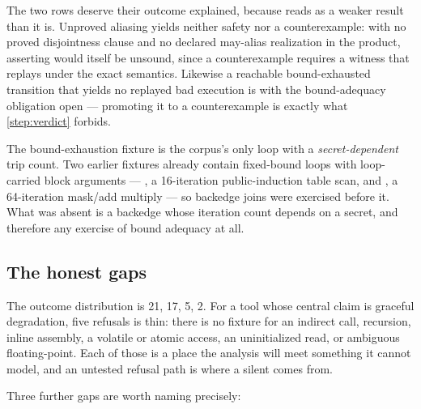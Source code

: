The two \Unknown{} rows deserve their outcome explained, because \Unknown{} reads
as a weaker result than it is. Unproved aliasing yields neither safety nor a
counterexample: with no proved disjointness clause and no declared may-alias
realization in the product, asserting \Unsafe{} would itself be unsound, since a
counterexample requires a witness that replays under the exact semantics.
Likewise a reachable bound-exhausted transition that yields no replayed bad
execution is \Unknown{} with the bound-adequacy obligation open --- promoting it
to a counterexample is exactly what \cref{step:verdict} forbids.

The bound-exhaustion fixture is the corpus's only loop with a
\emph{secret-dependent} trip count. Two earlier fixtures already contain
fixed-bound loops with loop-carried block arguments ---
, a 16-iteration public-induction table scan,
and , a 64-iteration mask/add multiply ---
so backedge joins were exercised before it. What was absent is a backedge whose
iteration count depends on a secret, and therefore any exercise of bound
adequacy at all.

\subsection{The honest gaps}

The outcome distribution is \Verified{} 21, \Unsafe{} 17, \Unknown{} 5,
\Conditional{} 2. For a tool whose central claim is graceful degradation, five
refusals is thin: there is no fixture for an indirect call, recursion, inline
assembly, a volatile or atomic access, an uninitialized read, or ambiguous
floating-point. Each of those is a place the analysis will meet something it
cannot model, and an untested refusal path is where a silent \Verified{} comes
from.

Three further gaps are worth naming precisely:

